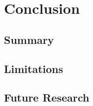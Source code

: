 \chapter{Conclusion} %

\label{Chapter7} %


\section{Summary}

\todosection


\section{Limitations}

\todosection


\section{Future Research}

\todosection